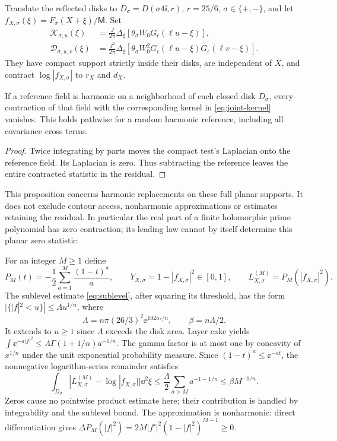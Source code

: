 Translate the reflected disks to $D_\sigma=D(\sigma4\ii,r)$,
$r=25/6$, $\sigma\in\{+,-\}$, and let
$f_{X,\sigma}(\xi)=F_\sigma(X+\xi)/\mathsf M$. Set
\begin{align}
 \mathcal K_{\sigma,u}(\xi)
  &=\frac{J}{2\pi}\Delta_\xi
       [\theta_\sigma W_0G_\epsilon(\ell u-\xi)],\label{eq:joint-kernel}\\
 \mathcal D_{\sigma,u,v}(\xi)
  &=\frac{J^2}{2\pi}\Delta_\xi
       [\theta_\sigma W_0^2G_\epsilon(\ell u-\xi)
                                     G_\epsilon(\ell v-\xi)].\nonumber
\end{align}
They have compact support strictly inside their disks, are independent
of $X$, and contract $\log|f_{X,\sigma}|$ to $r_X$ and $d_X$.

\begin{proposition}\label{prop:harmonic-joint}
If a reference field is harmonic on a neighborhood of each closed
disk $D_\sigma$, every contraction of that field with the corresponding
kernel in \eqref{eq:joint-kernel} vanishes. This holds pathwise for a
random harmonic reference, including all covariance cross terms.
\end{proposition}
\begin{proof}
Twice integrating by parts moves the compact test's Laplacian onto
the reference field. Its Laplacian is zero. Thus subtracting the
reference leaves the entire contracted statistic in the residual.
\end{proof}
This proposition concerns harmonic replacements on these full planar
supports. It does not exclude contour access, nonharmonic approximations
or estimates retaining the residual. In particular the real part of
a finite holomorphic prime polynomial has zero contraction; its leading
law cannot by itself determine this planar zero statistic.

For an integer $M\ge1$ define
\[
 P_M(t)=-\frac12\sum_{a=1}^M\frac{(1-t)^a}{a},\qquad
 Y_{X,\sigma}=1-|f_{X,\sigma}|^2\in[0,1],\qquad
 L_{X,\sigma}^{(M)}=P_M(|f_{X,\sigma}|^2).
\]
The sublevel estimate \eqref{eq:sublevel}, after squaring its threshold,
has the form
$|\{|f|^2<u\}|\le\Lambda u^{1/n}$, where
\[
 \Lambda=n\pi(26/3)^2\ee^{102a_*/n},\qquad \beta=n\Lambda/2.
\]
It extends to $u\ge1$ since $\Lambda$ exceeds the disk area.
Layer cake yields
$\int\ee^{-a|f|^2}\le\Lambda\Gamma(1+1/n)a^{-1/n}$.
The gamma factor is at most one by concavity of $x^{1/n}$ under
the unit exponential probability measure. Since $(1-t)^a\le\ee^{-at}$,
the nonnegative logarithm-series remainder satisfies
\begin{equation}\label{eq:polynomial-log-error}
 \int_{D_\sigma}|L_{X,\sigma}^{(M)}-\log|f_{X,\sigma}||\dd^2\xi
 \le\frac\Lambda2\sum_{a>M}a^{-1-1/n}
 \le\beta M^{-1/n}.
\end{equation}
Zeros cause no pointwise product estimate here; their contribution is
handled by integrability and the sublevel bound. The approximation is
nonharmonic: direct differentiation gives
$\Delta P_M(|f|^2)=2M|f'|^2(1-|f|^2)^{M-1}\ge0$.

